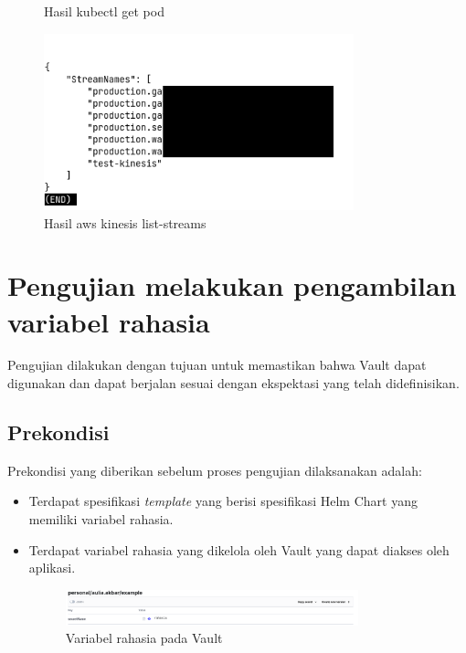 \begin{enumerate}
\begin{figure}
    	\caption{Hasil kubectl get pod}
    	\label{fig:getPodTemplate}
    \end{figure}
    \begin{figure}
    	\centering
    	\includegraphics[width=0.8\textwidth]{pics/5.4.listStreams.png}
    	\caption{Hasil aws kinesis list-streams}
    	\label{fig:listStream}
    \end{figure}
\end{enumerate}


\section{Pengujian melakukan pengambilan variabel rahasia}
Pengujian dilakukan dengan tujuan untuk memastikan bahwa Vault dapat digunakan dan dapat berjalan sesuai dengan ekspektasi yang telah didefinisikan.
\subsection{Prekondisi}
Prekondisi yang diberikan sebelum proses pengujian dilaksanakan adalah:
\begin{itemize}
    \item Terdapat spesifikasi \textit{template} yang berisi spesifikasi Helm Chart yang memiliki variabel rahasia.
    \item Terdapat variabel rahasia yang dikelola oleh Vault yang dapat diakses oleh aplikasi.
    \begin{figure}
    	\centering
    	\includegraphics[width=0.8\textwidth]{pics/5.5.vault.png}
    	\caption{Variabel rahasia pada Vault}
    	\label{fig:vault}
    \end{figure}
\end{itemize}
